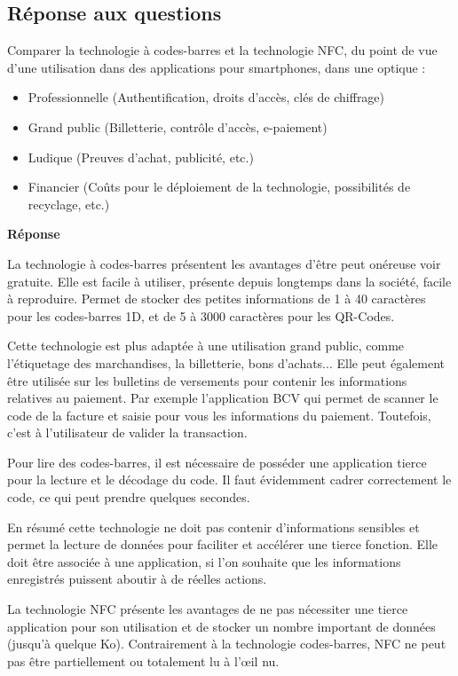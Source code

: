 \documentclass[francais,12pt]{article}
\begin{document}
	\subsection*{Réponse aux questions}
	Comparer la technologie à codes-barres et la technologie NFC, du point de vue d'une utilisation dans des applications pour smartphones, dans une optique : 
	\begin{itemize}
		\item Professionnelle (Authentification, droits d’accès, clés de chiffrage)
		\item Grand public (Billetterie, contrôle d’accès, e-paiement) 
		\item Ludique (Preuves d'achat, publicité, etc.)
		\item Financier (Coûts pour le déploiement de la technologie, possibilités de recyclage, etc.) 
	\end{itemize}

	{\color[rgb]{0,0.5,0.23}\textbf{Réponse}}
	
	La technologie à codes-barres présentent les avantages d'être peut onéreuse voir gratuite. Elle est facile à utiliser, présente depuis longtemps dans la société, facile à reproduire. Permet de stocker des petites informations de 1 à 40 caractères pour les codes-barres 1D, et de 5 à 3000 caractères pour les QR-Codes. 

	Cette technologie est plus adaptée à une utilisation grand public, comme l’étiquetage des marchandises, la billetterie, bons d'achats... 
	Elle peut également être utilisée sur les bulletins de versements pour contenir les informations relatives au paiement. Par exemple l'application BCV qui permet de scanner le code de la facture et saisie pour vous les informations du paiement. Toutefois, c'est à l'utilisateur de valider la transaction.
	
	Pour lire des codes-barres, il est nécessaire de posséder une application tierce pour la lecture et le décodage du code. Il faut évidemment cadrer correctement le code, ce qui peut prendre quelques secondes.
	
	En résumé cette technologie ne doit pas contenir d'informations sensibles et permet la lecture de données pour faciliter et accélérer une tierce fonction. Elle doit être associée à une application, si l'on souhaite que les informations enregistrés puissent aboutir à de réelles actions.
	
	La technologie NFC présente les avantages de ne pas nécessiter une tierce application pour son utilisation et de stocker un nombre important de données (jusqu'à quelque Ko). Contrairement à la technologie codes-barres, NFC ne peut pas être partiellement ou totalement lu à l'œil nu. 
	
\end{document}
